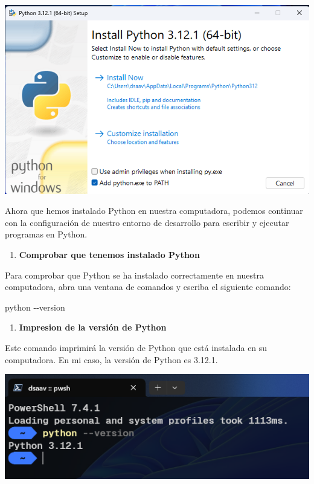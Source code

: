 \documentclass[
  a4paper,
  DIV=11,
  numbers=noendperiod,
  onepage,
  openany]{scrreprt}
\newenvironment{Shaded}{\begin{snugshade}}{\end{snugshade}}
\newcommand{\AttributeTok}[1]{\textcolor[rgb]{0.40,0.45,0.13}{#1}}
\newcommand{\ExtensionTok}[1]{\textcolor[rgb]{0.00,0.23,0.31}{#1}}
\providecommand{\tightlist}{%
  \setlength{\itemsep}{0pt}\setlength{\parskip}{0pt}}\usepackage{longtable,booktabs,array}
\begin{document}
\includegraphics{unidades/unidad2/images/paste-4.png}

Ahora que hemos instalado Python en nuestra computadora, podemos
continuar con la configuración de nuestro entorno de desarrollo para
escribir y ejecutar programas en Python.

\begin{enumerate}
\def\labelenumi{\arabic{enumi}.}
\setcounter{enumi}{2}
\tightlist
\item
  \textbf{Comprobar que tenemos instalado Python}
\end{enumerate}

Para comprobar que Python se ha instalado correctamente en nuestra
computadora, abra una ventana de comandos y escriba el siguiente
comando:

\begin{Shaded}
\begin{Highlighting}[]
\ExtensionTok{python} \AttributeTok{{-}{-}version}
\end{Highlighting}
\end{Shaded}

\begin{enumerate}
\def\labelenumi{\arabic{enumi}.}
\setcounter{enumi}{3}
\tightlist
\item
  \textbf{Impresion de la versión de Python}
\end{enumerate}

Este comando imprimirá la versión de Python que está instalada en su
computadora. En mi caso, la versión de Python es 3.12.1.

\includegraphics{unidades/unidad2/images/paste-5.png}
\end{document}
